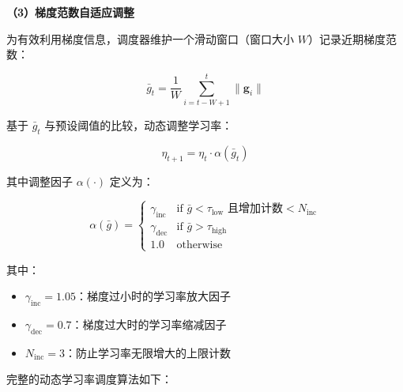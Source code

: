 \textbf{（3）梯度范数自适应调整}

为有效利用梯度信息，调度器维护一个滑动窗口（窗口大小 $W$）记录近期梯度范数：

\begin{equation}
\bar{g}_t = \frac{1}{W} \sum_{i=t-W+1}^{t} \|\mathbf{g}_i\|
\end{equation}

基于 $\bar{g}_t$ 与预设阈值的比较，动态调整学习率：

\begin{equation}
\eta_{t+1} = \eta_t \cdot \alpha(\bar{g}_t)
\end{equation}

其中调整因子 $\alpha(\cdot)$ 定义为：

\begin{equation}
\alpha(\bar{g}) = \begin{cases}
\gamma_{\text{inc}} & \text{if } \bar{g} < \tau_{\text{low}} \text{ 且增加计数} < N_{\text{inc}} \\
\gamma_{\text{dec}} & \text{if } \bar{g} > \tau_{\text{high}} \\
1.0 & \text{otherwise}
\end{cases}
\end{equation}

其中：
\begin{itemize}
    \item $\gamma_{\text{inc}} = 1.05$：梯度过小时的学习率放大因子
    \item $\gamma_{\text{dec}} = 0.7$：梯度过大时的学习率缩减因子
    \item $N_{\text{inc}} = 3$：防止学习率无限增大的上限计数
\end{itemize}


完整的动态学习率调度算法如下：

